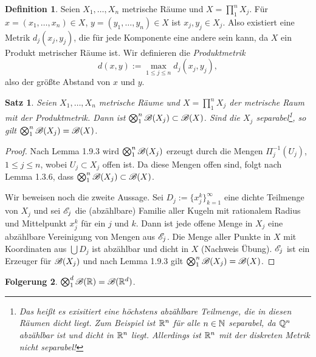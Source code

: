 \documentclass[
 a4paper,
 12pt,
 parskip=half
 ]{scrreprt}
\theoremstyle{plain}
\newtheorem{thm}{Satz}[section] %
\theoremstyle{definition}
\newtheorem{folg}[thm]{Folgerung}
\newtheorem*{defn*}{Definition}
\numberwithin{equation}{section}
\begin{document}
\begin{defn*}
 Seien $X_1, \ldots, X_n$ metrische Räume und $X = \prod_1^n X_j$. Für $x = (x_1, \ldots, x_n) \in X$, $y = (y_1, \ldots, y_n) \in X$ ist $x_j, y_j \in X_j$. Also existiert eine Metrik $d_j(x_j,y_j)$, die für jede Komponente eine andere sein kann, da $X$ ein Produkt metrischer Räume ist. Wir definieren die \emph{Produktmetrik}
 \[ d(x,y) := \max_{1 \le j \le n} d_j(x_j,y_j), \]
 also der größte Abstand von $x$ und $y$.
\end{defn*}
 
\begin{thm}
 Seien $X_1, \ldots, X_n$ metrische Räume und $X = \prod_1^n X_j$ der metrische Raum mit der Produktmetrik. Dann ist $\bigotimes_1^n \mathscr{B}(X_j) \subset \mathscr{B}(X)$. Sind die $X_j$ separabel\footnote{Das heißt es exisitiert eine höchstens abzählbare Teilmenge, die in diesen Räumen dicht liegt. Zum Beispiel ist $\mathbb{R}^n$ für alle $n \in \mathbb{N}$ separabel, da $\mathbb{Q}^n$ abzählbar ist und dicht in $\mathbb{R}^n$ liegt. Allerdings ist $\mathbb{R}^n$ mit der diskreten Metrik nicht separabel!}, so gilt $\bigotimes_1^n \mathscr{B}(X_j) = \mathscr{B}(X)$.
\end{thm}

\begin{proof}
 Nach Lemma 1.9.3 wird $\bigotimes_1^n \mathscr{B}(X_j)$ erzeugt durch die Mengen $\Pi_j^{-1}( U_j )$, $1 \le j \le n$, wobei $U_j \subset X_j$ offen ist. Da diese Mengen offen sind, folgt nach Lemma 1.3.6, dass $\bigotimes_1^n \mathscr{B}(X_j) \subset \mathscr{B}(X)$.
 
 Wir beweisen noch die zweite Aussage. Sei $D_j := \{ x_j^k \}_{k=1}^\infty$ eine dichte Teilmenge von $X_j$ und sei $\mathscr{E}_j$ die (abzählbare) Familie aller Kugeln mit rationalem Radius und Mittelpunkt $x_j^k$ für ein $j$ und $k$. Dann ist jede offene Menge in $X_j$ eine abzählbare Vereinigung von Mengen aus $\mathscr{E}_j$. Die Menge aller Punkte in $X$ mit Koordinaten aus $\bigcup D_j$ ist abzählbar und dicht in $X$ (Nachweis Übung). $\mathscr{E}_j$ ist ein Erzeuger für $\mathscr{B}(X_j)$ und nach Lemma 1.9.3 gilt $\bigotimes_1^n \mathscr{B}(X_j) = \mathscr{B}(X)$.
\end{proof}

\begin{folg}
 $\bigotimes_1^d \mathscr{B}(\mathbb{R}) = \mathscr{B}(\mathbb{R}^d)$.
\end{folg}
\end{document}
